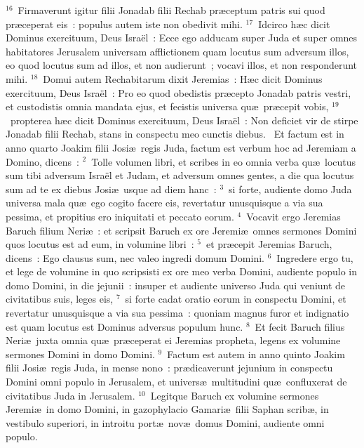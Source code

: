 ${}^{16}$~Firmaverunt igitur filii Jonadab filii Rechab pr\ae ceptum patris sui quod pr\ae ceperat eis~: populus autem iste non obedivit mihi.
${}^{17}$~Idcirco h\ae c dicit Dominus exercituum, Deus Isra\"el~: Ecce ego adducam super Juda et super omnes habitatores Jerusalem universam afflictionem quam locutus sum adversum illos, eo quod locutus sum ad illos, et non audierunt~; vocavi illos, et non responderunt mihi.
${}^{18}$~Domui autem Rechabitarum dixit Jeremias~: H\ae c dicit Dominus exercituum, Deus Isra\"el~: Pro eo quod obedistis pr\ae cepto Jonadab patris vestri, et custodistis omnia mandata ejus, et fecistis universa qu\ae\ pr\ae cepit vobis,
${}^{19}$~propterea h\ae c dicit Dominus exercituum, Deus Isra\"el~: Non deficiet vir de stirpe Jonadab filii Rechab, stans in conspectu meo cunctis diebus.
~\lettrine[lines=10,image=true,loversize=0.05,lraise=-0.03]{E}{}t factum est in anno quarto Joakim filii Josi\ae\ regis Juda, factum est verbum hoc ad Jeremiam a Domino, dicens~:
${}^{2}$~Tolle volumen libri, et scribes in eo omnia verba qu\ae\ locutus sum tibi adversum Isra\"el et Judam, et adversum omnes gentes, a die qua locutus sum ad te ex diebus Josi\ae\ usque ad diem hanc~:
${}^{3}$~si forte, audiente domo Juda universa mala qu\ae\ ego cogito facere eis, revertatur unusquisque a via sua pessima, et propitius ero iniquitati et peccato eorum.
${}^{4}$~Vocavit ergo Jeremias Baruch filium Neri\ae~: et scripsit Baruch ex ore Jeremi\ae\ omnes sermones Domini quos locutus est ad eum, in volumine libri~:
${}^{5}$~et pr\ae cepit Jeremias Baruch, dicens~: Ego clausus sum, nec valeo ingredi domum Domini.
${}^{6}$~Ingredere ergo tu, et lege de volumine in quo scripsisti ex ore meo verba Domini, audiente populo in domo Domini, in die jejunii~: insuper et audiente universo Juda qui veniunt de civitatibus suis, leges eis,
${}^{7}$~si forte cadat oratio eorum in conspectu Domini, et revertatur unusquisque a via sua pessima~: quoniam magnus furor et indignatio est quam locutus est Dominus adversus populum hunc.
${}^{8}$~Et fecit Baruch filius Neri\ae\ juxta omnia qu\ae\ pr\ae ceperat ei Jeremias propheta, legens ex volumine sermones Domini in domo Domini.
${}^{9}$~Factum est autem in anno quinto Joakim filii Josi\ae\ regis Juda, in mense nono~: pr\ae dicaverunt jejunium in conspectu Domini omni populo in Jerusalem, et univers\ae\ multitudini qu\ae\ confluxerat de civitatibus Juda in Jerusalem.
${}^{10}$~Legitque Baruch ex volumine sermones Jeremi\ae\ in domo Domini, in gazophylacio Gamari\ae\ filii Saphan scrib\ae , in vestibulo superiori, in introitu port\ae\ nov\ae\ domus Domini, audiente omni populo.
